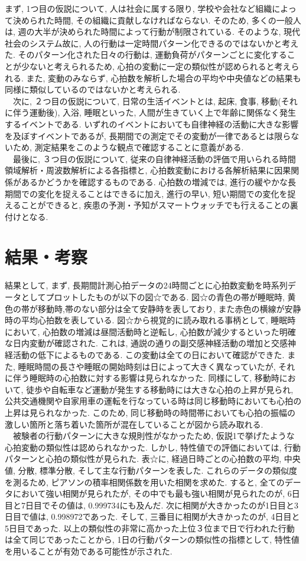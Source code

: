 \documentclass[report, 11pt, a4paper]{jsbook}
\begin{document}
まず, 1つ目の仮説について, 人は社会に属する限り, 学校や会社など組織によって決められた時間, その組織に貢献しなければならない. そのため, 多くの一般人は, 週の大半が決められた時間によって行動が制限されている. そのような, 現代社会のシステム故に, 人の行動は一定時間パターン化できるのではないかと考えた. そのパターン化された日々の行動は, 運動負荷がパターンごとに変化することが少ないと考えられるため, 心拍の変動に一定の類似性が認められると考えられる. また, 変動のみならず, 心拍数を解析した場合の平均や中央値などの結果も同様に類似しているのではないかと考えられる. \\
　次に, ２つ目の仮説について, 日常の生活イベントとは, 起床, 食事, 移動(それに伴う運動後), 入浴, 睡眠といった, 人間が生きていく上で年齢に関係なく発生するイベントである. いずれのイベントにおいても自律神経の活動に大きな影響を及ぼすイベントであるが, 長期間での測定でその変動が一律であるとは限らないため, 測定結果をこのような観点で確認することに意義がある. \\
　最後に, ３つ目の仮説について, 従来の自律神経活動の評価で用いられる時間領域解析・周波数解析による各指標と, 心拍数変動における各解析結果に因果関係があるかどうかを確認するものである. 心拍数の増減では, 進行の緩やかな長期間での変化を捉えることはできるに加え, 進行の早い, 短い期間での変化を捉えることができると, 疾患の予測・予知がスマートウォッチでも行えることの裏付けとなる. 
　
\section{結果・考察}
結果として, まず, 長期間計測心拍データの24時間ごとに心拍数変動を時系列データとしてプロットしたものが以下の図☆である. 図☆の青色の帯が睡眠時, 黄色の帯が移動時,帯のない部分は全て安静時を表しており, また赤色の横線が安静時の平均心拍数を表している. 図☆から視覚的に読み取れる事柄として, 睡眠時において, 心拍数の増減は昼間活動時と逆転し, 心拍数が減少するといった明確な日内変動が確認された. これは, 通説の通りの副交感神経活動の増加と交感神経活動の低下によるものである. この変動は全ての日において確認ができた. また, 睡眠時間の長さや睡眠の開始時刻は日によって大きく異なっていたが, それに伴う睡眠時の心拍数に対する影響は見られなかった. 同様にして, 移動時において, 徒歩や自転車など運動が発生する移動時には大きな心拍の上昇が見られ, 公共交通機関や自家用車の運転を行なっている時は同じ移動時においても心拍の上昇は見られなかった. このため, 同じ移動時の時間帯においても心拍の振幅の激しい箇所と落ち着いた箇所が混在していることが図から読み取れる. \\
　被験者の行動パターンに大きな規則性がなかったため, 仮説1で挙げたような心拍変動の類似性は認められなかった. しかし, 特性値での評価においては, 行動パターンと心拍の類似性が見られた. 表☆に, 経過日時ごとの心拍数の平均, 中央値, 分散, 標準分散, そして主な行動パターンを表した. これらのデータの類似度を測るため, ピアソンの積率相関係数を用いた相関を求めた. すると, 全てのデータにおいて強い相関が見られたが, その中でも最も強い相関が見られたのが, 6日目と7日目でその値は, 0.999734にも及んだ. 次に相関が大きかったのが1日目と3日目で値は, 0.998972であった. そして, 三番目に相関が大きかったのが, 4日目と5日目であった. 以上の類似性の非常に高かった上位３位まで日で行われた行動は全て同じであったことから, 1日の行動パターンの類似性の指標として, 特性値を用いることが有効である可能性が示された.  
 
\end{document}
